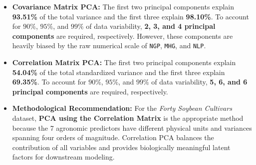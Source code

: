\documentclass[11pt,a4paper]{article}
\begin{document}
\begin{itemize}
    \item \textbf{Covariance Matrix PCA:} The first two principal components explain \textbf{93.51\%} of the total variance and the first three explain \textbf{98.10\%}. To account for $90\%$, $95\%$, and $99\%$ of data variability, \textbf{2, 3, and 4 principal components} are required, respectively. However, these components are heavily biased by the raw numerical scale of \texttt{NGP}, \texttt{MHG}, and \texttt{NLP}.
    \item \textbf{Correlation Matrix PCA:} The first two principal components explain \textbf{54.04\%} of the total standardized variance and the first three explain \textbf{69.35\%}. To account for $90\%$, $95\%$, and $99\%$ of data variability, \textbf{5, 6, and 6 principal components} are required, respectively.
    \item \textbf{Methodological Recommendation:} For the \textit{Forty Soybean Cultivars} dataset, \textbf{PCA using the Correlation Matrix} is the appropriate method because the 7 agronomic predictors have different physical units and variances spanning four orders of magnitude. Correlation PCA balances the contribution of all variables and provides biologically meaningful latent factors for downstream modeling.
\end{itemize}
\end{document}

